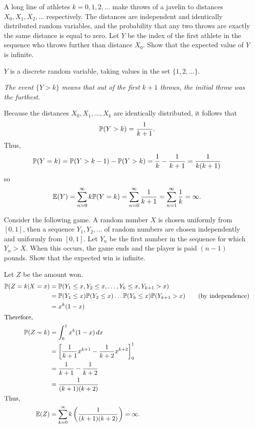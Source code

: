 \begin{exercise}
\begin{questions}

\question
A long line of athletes $k=0,1,2,\ldots$ make throws of a javelin to distances $X_0,X_1,X_2,\ldots$ respectively. The distances are independent and identically distributed random variables, and the probability that any two throws are exactly the same distance is equal to zero. Let $Y$ be the index of the first athlete in the sequence who throws further than distance $X_0$. Show that the expected value of $Y$ is infinite.

\begin{answer}
$Y$ is a discrete random variable, taking values in the set $\{1,2,\ldots\}$.

\bit
\it The event $\{Y>k\}$ means that out of the first $k+1$ throws, the initial throw was the furthest.
\eit

Because the distances $X_0,X_1,\ldots,X_k$ are identically distributed, it follows that 
\[
\mathbb{P}(Y>k)=\frac{1}{k+1}.
\]
Thus, 
\[
\mathbb{P}(Y=k) = \mathbb{P}(Y>k-1) - \mathbb{P}(Y>k) = \frac{1}{k} - \frac{1}{k+1} = \frac{1}{k(k+1)}
\]
so
\[
\mathbb{E}(Y)
	= \sum_{n=0}^\infty k\mathbb{P}(Y=k)
	= \sum_{n=0}^\infty \frac{1}{k+1} 
	= \sum_{n=1}^\infty \frac{1}{k}
	= \infty.
\]
\end{answer}

\question
Consider the following game. A random number $X$ is chosen uniformly from $[0,1]$, then a sequence $Y_1,Y_2,\ldots$ of random numbers are chosen independently and uniformly from $[0,1]$. Let $Y_n$ be the first number in the sequence for which $Y_n > X$. When this occurs, the game ends and the player is paid $(n-1)$ pounds. Show that the expected win is infinite.
\begin{answer}
Let $Z$ be the amount won.
\begin{align*}
\mathbb{P}(Z=k|X=x)
	& = \mathbb{P}(Y_1\leq x,Y_2\leq x,\ldots,Y_k\leq x,Y_{k+1}>x) \\
	& = \mathbb{P}(Y_1\leq x)\mathbb{P}(Y_2\leq x)\ldots \mathbb{P}(Y_k\leq x)\mathbb{P}(Y_{k+1}>x) \qquad\text{(by independence)}\\
	& = x^k(1-x) \\
\intertext{Therefore,}
\mathbb{P}(Z=k)
	& = \int_0^1 x^k(1-x)\,dx \\
	& = \left[\frac{1}{k+1}x^{k+1}-\frac{1}{k+2}x^{k+2}\right]_0^1 \\
	& = \frac{1}{k+1} - \frac{1}{k+2} \\
	& = \frac{1}{(k+1)(k+2)} \\
\intertext{Thus,}
\mathbb{E}(Z)
	& = \sum_{k=0}^{\infty}k\left(\frac{1}{(k+1)(k+2)}\right) = \infty.
\end{align*}
\end{answer} 



\end{questions}
\end{exercise}
